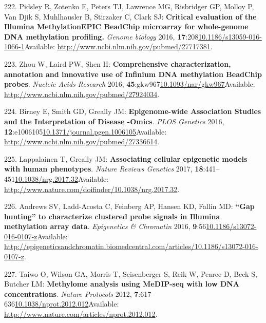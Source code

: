 \documentclass[
]{book}
\begin{document}
\leavevmode\hypertarget{ref-Pidsley2016}{}%
222. Pidsley R, Zotenko E, Peters TJ, Lawrence MG, Risbridger GP, Molloy P, Van Djik S, Muhlhausler B, Stirzaker C, Clark SJ: \textbf{Critical evaluation of the Illumina MethylationEPIC BeadChip microarray for whole-genome DNA methylation profiling.} \emph{Genome biology} 2016, \textbf{17}:208\href{https://doi.org/10.1186/s13059-016-1066-1}{10.1186/s13059-016-1066-1}Available: \url{http://www.ncbi.nlm.nih.gov/pubmed/27717381}.

\leavevmode\hypertarget{ref-Zhou2017}{}%
223. Zhou W, Laird PW, Shen H: \textbf{Comprehensive characterization, annotation and innovative use of Infinium DNA methylation BeadChip probes}. \emph{Nucleic Acids Research} 2016, \textbf{45}:gkw967\href{https://doi.org/10.1093/nar/gkw967}{10.1093/nar/gkw967}Available: \url{http://www.ncbi.nlm.nih.gov/pubmed/27924034}.

\leavevmode\hypertarget{ref-Birney2016}{}%
224. Birney E, Smith GD, Greally JM: \textbf{Epigenome-wide Association Studies and the Interpretation of Disease -Omics}. \emph{PLOS Genetics} 2016, \textbf{12}:e1006105\href{https://doi.org/10.1371/journal.pgen.1006105}{10.1371/journal.pgen.1006105}Available: \url{http://www.ncbi.nlm.nih.gov/pubmed/27336614}.

\leavevmode\hypertarget{ref-Lappalainen2017}{}%
225. Lappalainen T, Greally JM: \textbf{Associating cellular epigenetic models with human phenotypes}. \emph{Nature Reviews Genetics} 2017, \textbf{18}:441--451\href{https://doi.org/10.1038/nrg.2017.32}{10.1038/nrg.2017.32}Available: \url{http://www.nature.com/doifinder/10.1038/nrg.2017.32}.

\leavevmode\hypertarget{ref-Andrews2016}{}%
226. Andrews SV, Ladd-Acosta C, Feinberg AP, Hansen KD, Fallin MD: \textbf{``Gap hunting'' to characterize clustered probe signals in Illumina methylation array data}. \emph{Epigenetics \& Chromatin} 2016, \textbf{9}:56\href{https://doi.org/10.1186/s13072-016-0107-z}{10.1186/s13072-016-0107-z}Available: \url{http://epigeneticsandchromatin.biomedcentral.com/articles/10.1186/s13072-016-0107-z}.

\leavevmode\hypertarget{ref-Taiwo2012}{}%
227. Taiwo O, Wilson GA, Morris T, Seisenberger S, Reik W, Pearce D, Beck S, Butcher LM: \textbf{Methylome analysis using MeDIP-seq with low DNA concentrations}. \emph{Nature Protocols} 2012, \textbf{7}:617--636\href{https://doi.org/10.1038/nprot.2012.012}{10.1038/nprot.2012.012}Available: \url{http://www.nature.com/articles/nprot.2012.012}.
\end{document}
